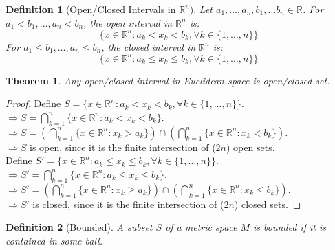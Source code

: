 \documentclass{article}
\newtheorem{definition}{Definition}[section]
\newtheorem{theorem}{Theorem}[section]
\begin{document}
			\begin{definition}[Open/Closed Intervals in $\mathbb{R}^n$]
				\label{open closed intervals}
				Let $a_1, \ldots, a_n, b_1, \ldots b_n \in \mathbb{R}$.
				For $a_1 < b_1, \ldots, a_n < b_n$, the open interval in $\mathbb{R}^n$ is:
				$$ \{ x \in \mathbb{R}^n: a_k < x_k < b_k, \forall k \in \{ 1, \ldots, n \} \}$$
				For $a_1 \leq b_1, \ldots, a_n \leq b_n$, the closed interval in $\mathbb{R}^n$ is:
				$$ \{ x \in \mathbb{R}^n: a_k \leq x_k \leq b_k, \forall k \in \{ 1, \ldots, n \} \}$$
			\end{definition}

			\begin{theorem}
				Any open/closed interval in Euclidean space is open/closed set.
			\end{theorem}
			\begin{proof} 
				Define $S = \{ x \in \mathbb{R}^n: a_k < x_k < b_k, \forall k \in \{ 1, \ldots, n \} \}$. \\
				$\Rightarrow S = \bigcap_{k=1}^{n} \{ x \in \mathbb{R}^n: a_k < x_k < b_k \}$. \\
				$\Rightarrow S = (\bigcap_{k=1}^{n} \{ x \in \mathbb{R}^n: x_k > a_k \}) \cap (\bigcap_{k=1}^{n} \{ x \in \mathbb{R}^n: x_k < b_k \})$. \\
				$\Rightarrow S$ is open, since it is the finite intersection of ($2n$) open sets. \\

				Define $S' = \{ x \in \mathbb{R}^n: a_k \leq x_k \leq b_k, \forall k \in \{ 1, \ldots, n \} \}$. \\
				$\Rightarrow S' = \bigcap_{k=1}^{n} \{ x \in \mathbb{R}^n: a_k \leq x_k \leq b_k \}$. \\
				$\Rightarrow S' = (\bigcap_{k=1}^{n} \{ x \in \mathbb{R}^n: x_k \geq a_k \}) \cap (\bigcap_{k=1}^{n} \{ x \in \mathbb{R}^n: x_k \leq b_k \})$. \\
				$\Rightarrow S'$ is closed, since it is the finite intersection of ($2n$) closed sets.
			\end{proof}

			\begin{definition}[Bounded]
				\label{bounded}
				A subset $S$ of a metric space $M$ is bounded if it is contained in some ball.
			\end{definition}
\end{document}
